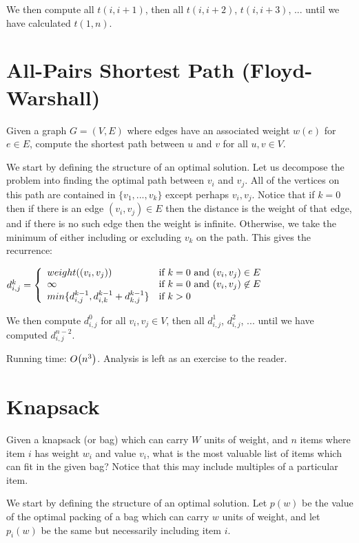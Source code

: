We then compute all $t(i,i+1)$, then all $t(i,i+2)$, $t(i,i+3)$,
... until we have calculated $t(1,n)$.

\hypertarget{sec:floyd_warshall}{\section{All-Pairs Shortest Path
    (Floyd-Warshall)}}

Given a graph $G=(V,E)$ where edges have an associated weight $w(e)$
for $e \in E$, compute the shortest path between $u$ and $v$ for all
$u,v \in V$.

We start by defining the structure of an optimal solution.  Let us
decompose the problem into finding the optimal path between $v_i$ and
$v_j$.  All of the vertices on this path are contained in $\{
v_1,...,v_k \}$ except perhaps $v_i,v_j$.  Notice that if $k=0$ then
if there is an edge $(v_i,v_j) \in E$ then the distance is the weight
of that edge, and if there is no such edge then the weight is
infinite.  Otherwise, we take the minimum of either including or
excluding $v_k$ on the path.  This gives the recurrence:

\begin{math}
  d^k_{i,j} = \left\{
    \begin{array}{l l}
      weight((v_i,v_j)) & \text{if $k=0$ and $(v_i,v_j) \in E$} \\
      \infty            & \text{if $k=0$ and $(v_i,v_j) \not \in E$} \\
      min \{ d^{k-1}_{i,j},d^{k-1}_{i,k} + d^{k-1}_{k,j} \} & \text{if $k>0$}
    \end{array} \right.
\end{math}

We then compute $d^0_{i,j}$ for all $v_i,v_j \in V$, then all
$d^1_{i,j}$, $d^2_{i,j}$, ... until we have computed $d^{n-2}_{i,j}$.

Running time: $O\!\left(n^3\right)$.  Analysis is left as an exercise to the reader.

\section{Knapsack}

Given a knapsack (or bag) which can carry $W$ units of weight, and $n$
items where item $i$ has weight $w_i$ and value $v_i$, what is the
most valuable list of items which can fit in the given bag?  Notice
that this may include multiples of a particular item.

We start by defining the structure of an optimal solution.  Let $p(w)$
be the value of the optimal packing of a bag which can carry $w$ units
of weight, and let $p_i(w)$ be the same but necessarily including item
$i$.

